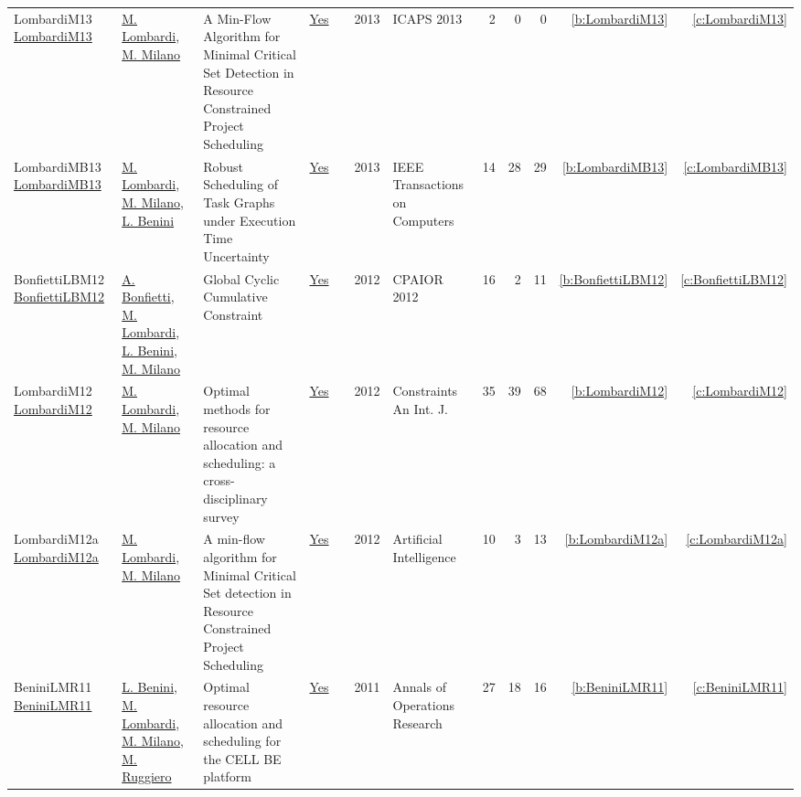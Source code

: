 {\begin{longtable}{>{\raggedright\arraybackslash}p{3cm}>{\raggedright\arraybackslash}p{6cm}>{\raggedright\arraybackslash}p{6.5cm}rrrp{2.5cm}rrrrr}
LombardiM13 \href{http://www.aaai.org/ocs/index.php/ICAPS/ICAPS13/paper/view/6052}{LombardiM13} & \hyperref[auth:a143]{M. Lombardi}, \hyperref[auth:a144]{M. Milano} & A Min-Flow Algorithm for Minimal Critical Set Detection in Resource Constrained Project Scheduling & \href{../works/LombardiM13.pdf}{Yes} & \cite{LombardiM13} & 2013 & ICAPS 2013 & 2 & 0 & 0 & \ref{b:LombardiM13} & \ref{c:LombardiM13}\\
LombardiMB13 \href{http://dx.doi.org/10.1109/tc.2011.203}{LombardiMB13} & \hyperref[auth:a143]{M. Lombardi}, \hyperref[auth:a144]{M. Milano}, \hyperref[auth:a248]{L. Benini} & Robust Scheduling of Task Graphs under Execution Time Uncertainty & \href{../works/LombardiMB13.pdf}{Yes} & \cite{LombardiMB13} & 2013 & IEEE Transactions on Computers & 14 & 28 & 29 & \ref{b:LombardiMB13} & \ref{c:LombardiMB13}\\
BonfiettiLBM12 \href{https://doi.org/10.1007/978-3-642-29828-8\_6}{BonfiettiLBM12} & \hyperref[auth:a204]{A. Bonfietti}, \hyperref[auth:a143]{M. Lombardi}, \hyperref[auth:a248]{L. Benini}, \hyperref[auth:a144]{M. Milano} & Global Cyclic Cumulative Constraint & \href{../works/BonfiettiLBM12.pdf}{Yes} & \cite{BonfiettiLBM12} & 2012 & CPAIOR 2012 & 16 & 2 & 11 & \ref{b:BonfiettiLBM12} & \ref{c:BonfiettiLBM12}\\
LombardiM12 \href{https://doi.org/10.1007/s10601-011-9115-6}{LombardiM12} & \hyperref[auth:a143]{M. Lombardi}, \hyperref[auth:a144]{M. Milano} & Optimal methods for resource allocation and scheduling: a cross-disciplinary survey & \href{../works/LombardiM12.pdf}{Yes} & \cite{LombardiM12} & 2012 & Constraints An Int. J. & 35 & 39 & 68 & \ref{b:LombardiM12} & \ref{c:LombardiM12}\\
LombardiM12a \href{https://doi.org/10.1016/j.artint.2011.12.001}{LombardiM12a} & \hyperref[auth:a143]{M. Lombardi}, \hyperref[auth:a144]{M. Milano} & A min-flow algorithm for Minimal Critical Set detection in Resource Constrained Project Scheduling & \href{../works/LombardiM12a.pdf}{Yes} & \cite{LombardiM12a} & 2012 & Artificial Intelligence & 10 & 3 & 13 & \ref{b:LombardiM12a} & \ref{c:LombardiM12a}\\
BeniniLMR11 \href{https://doi.org/10.1007/s10479-010-0718-x}{BeniniLMR11} & \hyperref[auth:a248]{L. Benini}, \hyperref[auth:a143]{M. Lombardi}, \hyperref[auth:a144]{M. Milano}, \hyperref[auth:a727]{M. Ruggiero} & Optimal resource allocation and scheduling for the {CELL} {BE} platform & \href{../works/BeniniLMR11.pdf}{Yes} & \cite{BeniniLMR11} & 2011 & Annals of Operations Research & 27 & 18 & 16 & \ref{b:BeniniLMR11} & \ref{c:BeniniLMR11}\\

\end{longtable}}
